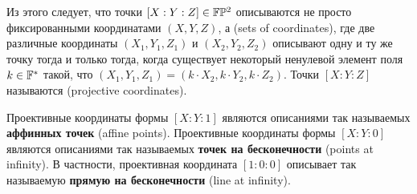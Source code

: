 Из этого следует, что точки $[X:Y:Z]\in \mathbb{F}\mathbb{P}^2$ описываются не просто фиксированными координатами $(X,Y,Z)$, а  (sets of coordinates), где две различные координаты $(X_1,Y_1,Z_1)$ и $(X_2,Y_2,Z_2)$ описывают одну и ту же точку тогда и только тогда, когда существует некоторый ненулевой элемент поля $k\in\mathbb{F}^*$ такой, что $(X_1,Y_1,Z_1) = (k\cdot X_2,k\cdot Y_2,k\cdot Z_2)$. Точки $[X:Y:Z]$ называются  (projective coordinates).

\begin{notation}
Проективные координаты формы $[X:Y:1]$ являются описаниями так называемых \textbf{аффинных точек} (affine points). Проективные координаты формы $[X:Y:0]$ являются описаниями так называемых \textbf{точек на бесконечности} (points at infinity). В частности, проективная координата $[1:0:0]$ описывает так называемую \textbf{прямую на бесконечности} (line at infinity).
\end{notation}
